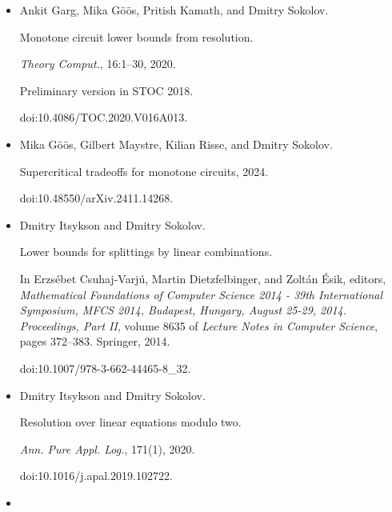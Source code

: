 \begin{itemize}
\emph{J. ACM}, 52(6):835–865, 2005.


doi:10.1145/1101821.1101822.





\item[] 
[17]

Ankit Garg, Mika Göös, Pritish Kamath, and Dmitry Sokolov.


Monotone circuit lower bounds from resolution.


\emph{Theory Comput.}, 16:1–30, 2020.


Preliminary version in STOC 2018.


doi:10.4086/TOC.2020.V016A013.





\item[] 
[18]

Mika Göös, Gilbert Maystre, Kilian Risse, and Dmitry Sokolov.


Supercritical tradeoffs for monotone circuits, 2024.


doi:10.48550/arXiv.2411.14268.





\item[] 
[19]

Dmitry Itsykson and Dmitry Sokolov.


Lower bounds for splittings by linear combinations.


In Erzsébet Csuhaj-Varjú, Martin Dietzfelbinger, and
Zoltán Ésik, editors, \emph{Mathematical Foundations of Computer
Science 2014 - 39th International Symposium, MFCS 2014, Budapest, Hungary,
August 25-29, 2014. Proceedings, Part II}, volume 8635 of \emph{Lecture
Notes in Computer Science}, pages 372–383. Springer, 2014.


doi:10.1007/978-3-662-44465-8\_32.





\item[] 
[20]

Dmitry Itsykson and Dmitry Sokolov.


Resolution over linear equations modulo two.


\emph{Ann. Pure Appl. Log.}, 171(1), 2020.


doi:10.1016/j.apal.2019.102722.





\item[] 
[21]


\end{itemize}
